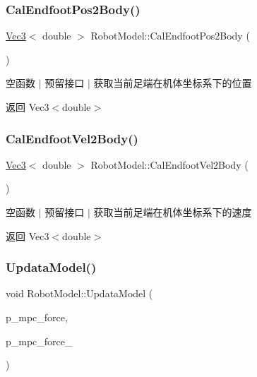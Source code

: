 \subsubsection{\texorpdfstring{Cal\+Endfoot\+Pos2\+Body()}{CalEndfootPos2Body()}}
{\footnotesize\ttfamily \hyperlink{cppTypes_8h_a65c27bf97693676535dd0b30ea0ad399}{Vec3}$<$ double $>$ Robot\+Model\+::\+Cal\+Endfoot\+Pos2\+Body (\begin{DoxyParamCaption}\item[{void}]{ }\end{DoxyParamCaption})}



空函数 $\vert$ 预留接口 $\vert$ 获取当前足端在机体坐标系下的位置 

\begin{DoxyReturn}{返回}
Vec3$<$double$>$ 
\end{DoxyReturn}
\mbox{\label{classquadruped_1_1RobotModel_a1e5c0b934e4e3d5a1914f5a965f13acc}} 
\subsubsection{\texorpdfstring{Cal\+Endfoot\+Vel2\+Body()}{CalEndfootVel2Body()}}
{\footnotesize\ttfamily \hyperlink{cppTypes_8h_a65c27bf97693676535dd0b30ea0ad399}{Vec3}$<$ double $>$ Robot\+Model\+::\+Cal\+Endfoot\+Vel2\+Body (\begin{DoxyParamCaption}\item[{void}]{ }\end{DoxyParamCaption})}



空函数 $\vert$ 预留接口 $\vert$ 获取当前足端在机体坐标系下的速度 

\begin{DoxyReturn}{返回}
Vec3$<$double$>$ 
\end{DoxyReturn}
\mbox{\label{classquadruped_1_1RobotModel_ab9102ec0f630d1623764b383784669c4}} 
\subsubsection{\texorpdfstring{Updata\+Model()}{UpdataModel()}}
{\footnotesize\ttfamily void Robot\+Model\+::\+Updata\+Model (\begin{DoxyParamCaption}\item[{\hyperlink{cppTypes_8h_a87f228860242acc66da2e58086d18cec}{Vec12}$<$ double $>$}]{p\+\_\+mpc\+\_\+force,  }\item[{\hyperlink{cppTypes_8h_a87f228860242acc66da2e58086d18cec}{Vec12}$<$ double $>$}]{p\+\_\+mpc\+\_\+force\+\_ }\end{DoxyParamCaption})}



